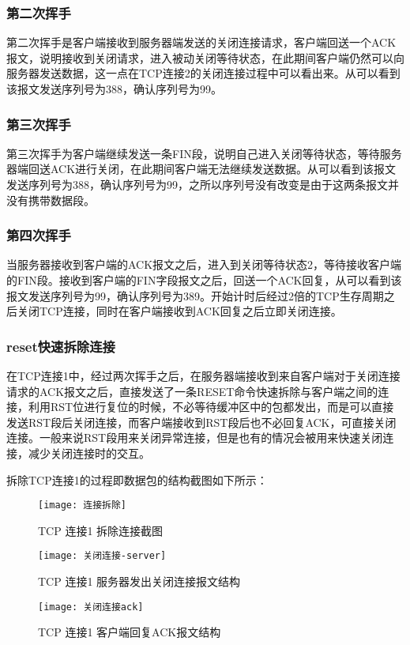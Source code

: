 \documentclass[lang=cn,11pt]{elegantpaper}
\begin{document}
\subsubsection{第二次挥手}

第二次挥手是客户端接收到服务器端发送的关闭连接请求，客户端回送一个ACK报文，说明接收到关闭请求，进入被动关闭等待状态，在此期间客户端仍然可以向服务器发送数据，这一点在TCP连接2的关闭连接过程中可以看出来。从可以看到该报文发送序列号为388，确认序列号为99。

\subsubsection{第三次挥手}


第三次挥手为客户端继续发送一条FIN段，说明自己进入关闭等待状态，等待服务器端回送ACK进行关闭，在此期间客户端无法继续发送数据。从可以看到该报文发送序列号为388，确认序列号为99，之所以序列号没有改变是由于这两条报文并没有携带数据段。


\subsubsection{第四次挥手}

当服务器接收到客户端的ACK报文之后，进入到关闭等待状态2，等待接收客户端的FIN段。接收到客户端的FIN字段报文之后，回送一个ACK回复，从可以看到该报文发送序列号为99，确认序列号为389。开始计时后经过2倍的TCP生存周期之后关闭TCP连接，同时在客户端接收到ACK回复之后立即关闭连接。

\subsubsection{reset快速拆除连接}

在TCP连接1中，经过两次挥手之后，在服务器端接收到来自客户端对于关闭连接请求的ACK报文之后，直接发送了一条RESET命令快速拆除与客户端之间的连接，利用RST位进行复位的时候，不必等待缓冲区中的包都发出，而是可以直接发送RST段后关闭连接，而客户端接收到RST段后也不必回复ACK，可直接关闭连接。一般来说RST段用来关闭异常连接，但是也有的情况会被用来快速关闭连接，减少关闭连接时的交互。

拆除TCP连接1的过程即数据包的结构截图如下所示：

\begin{figure}[htbp]
	\centering
	\texttt{[image: 连接拆除]}
	\caption{TCP 连接1 拆除连接截图 \label{fig:18}}
	\centering
	\texttt{[image: 关闭连接-server]}
	\caption{TCP 连接1 服务器发出关闭连接报文结构 \label{fig:19}}
	\centering
	\texttt{[image: 关闭连接ack]}
	\caption{TCP 连接1 客户端回复ACK报文结构\label{fig:20}}
\end{figure}
\end{document}
